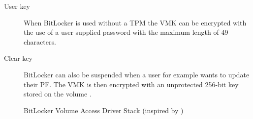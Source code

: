 \begin{description}
    \item[User key] When BitLocker is used without a \ac{TPM} the \ac{VMK} can be encrypted with the use of a user supplied password with the maximum length of 49 characters. \cite[Section 2.7]{bde-format-spec}

    \item[Clear key] BitLocker can also be suspended when a user for example wants to update their \ac{PF}.
        The \ac{VMK} is then encrypted with an unprotected 256-bit key stored on the volume \cite[Section 2.5]{bde-format-spec}.

\end{description}

\begin{figure}[htb]%
    \centering
    
    \caption{BitLocker Volume Access Driver Stack (inspired by \cite[Figure 9-24]{windows-internals-6-part2})}%
    \label{fig:bitlocker-volume-access-driver-stack}%
\end{figure}